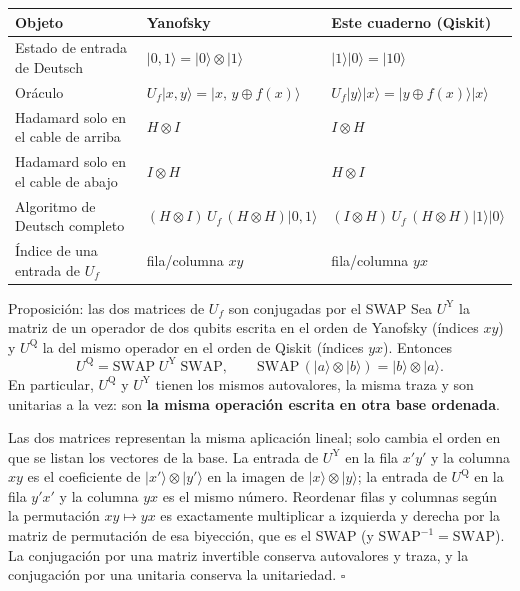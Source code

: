 \documentclass[11pt, a4paper, twoside, openright]{report}
\providecommand{\ket}[1]{|#1\rangle}
\begin{document}
\begin{center}
\small\renewcommand{\arraystretch}{1.35}
\begin{tabular}{l|l|l}
\textbf{Objeto} & \textbf{Yanofsky} & \textbf{Este cuaderno (Qiskit)} \\ \hline
Estado de entrada de Deutsch & $\ket{0,1} = \ket{0}\otimes\ket{1}$ & $\ket{1}\ket{0} = \ket{10}$ \\
Oráculo & $U_f\ket{x,y} = \ket{x,\,y\oplus f(x)}$ & $U_f\ket{y}\ket{x} = \ket{y\oplus f(x)}\ket{x}$ \\
Hadamard solo en el cable de arriba & $H\otimes I$ & $I\otimes H$ \\
Hadamard solo en el cable de abajo & $I\otimes H$ & $H\otimes I$ \\
Algoritmo de Deutsch completo & $(H\otimes I)\,U_f\,(H\otimes H)\ket{0,1}$ & $(I\otimes H)\,U_f\,(H\otimes H)\ket{1}\ket{0}$ \\
Índice de una entrada de $U_f$ & fila/columna $xy$ & fila/columna $yx$
\end{tabular}
\end{center}

\begin{teoria}{Proposición: las dos matrices de $U_f$ son conjugadas por el SWAP}
Sea $U^{\mathrm{Y}}$ la matriz de un operador de dos qubits escrita en el orden de Yanofsky (índices $xy$) y $U^{\mathrm{Q}}$ la del mismo operador en el orden de Qiskit (índices $yx$). Entonces
\[ U^{\mathrm{Q}} = \mathrm{SWAP}\; U^{\mathrm{Y}}\; \mathrm{SWAP}, \qquad \mathrm{SWAP}\,(\ket{a}\otimes\ket{b}) = \ket{b}\otimes\ket{a}. \]
En particular, $U^{\mathrm{Q}}$ y $U^{\mathrm{Y}}$ tienen los mismos autovalores, la misma traza y son unitarias a la vez: son \textbf{la misma operación escrita en otra base ordenada}.
\end{teoria}

\begin{demo}
Las dos matrices representan la misma aplicación lineal; solo cambia el orden en que se listan los vectores de la base. La entrada de $U^{\mathrm{Y}}$ en la fila $x'y'$ y la columna $xy$ es el coeficiente de $\ket{x'}\otimes\ket{y'}$ en la imagen de $\ket{x}\otimes\ket{y}$; la entrada de $U^{\mathrm{Q}}$ en la fila $y'x'$ y la columna $yx$ es el mismo número. Reordenar filas y columnas según la permutación $xy \mapsto yx$ es exactamente multiplicar a izquierda y derecha por la matriz de permutación de esa biyección, que es el SWAP (y $\mathrm{SWAP}^{-1} = \mathrm{SWAP}$). La conjugación por una matriz invertible conserva autovalores y traza, y la conjugación por una unitaria conserva la unitariedad. \hfill$\square$
\end{demo}
\end{document}

